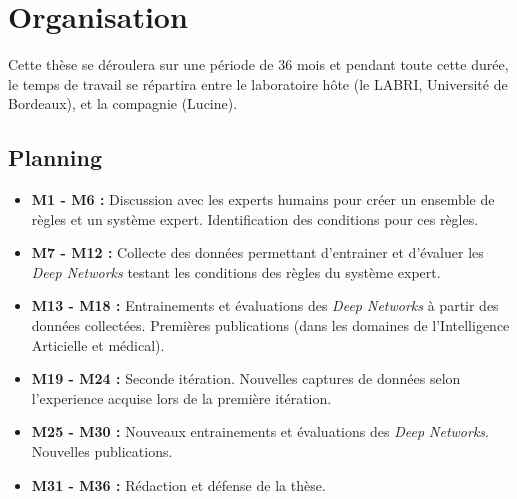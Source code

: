 \documentclass[french]{article}
\begin{document}
\section{Organisation}
\label{sec:org66b1492}
Cette thèse se déroulera sur une période de 36 mois et pendant toute cette
durée, le temps de travail se répartira entre le laboratoire hôte (le LABRI,
Université de Bordeaux), et la compagnie (Lucine).

\subsection{Planning}
\label{sec:org2dc06f3}
\begin{itemize}
\item \textbf{M1 - M6 :} Discussion avec les experts humains pour créer un ensemble de règles et un système expert. Identification des conditions pour ces règles.
\item \textbf{M7 - M12 :} Collecte des données permettant d’entrainer et d’évaluer les \emph{Deep Networks} testant les conditions des règles du système expert.
\item \textbf{M13 - M18 :} Entrainements et évaluations des \emph{Deep Networks} à partir des données col\-lectées. Premières publications (dans les domaines de l’Intelligence Articielle et médical).
\item \textbf{M19 - M24 :} Seconde itération. Nouvelles captures de données selon l’experience acquise lors de la première itération.
\item \textbf{M25 - M30 :} Nouveaux entrainements et évaluations des \emph{Deep Networks}. Nouvelles pub\-lications.
\item \textbf{M31 - M36 :} Rédaction et défense de la thèse.
\end{itemize}




\end{document}
